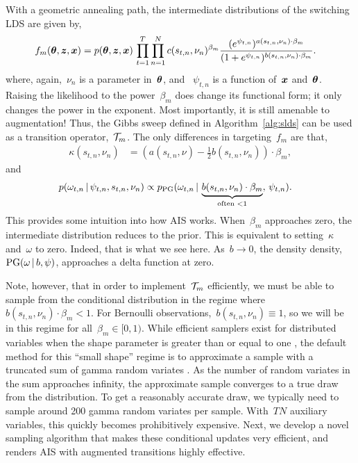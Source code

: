 With a geometric annealing path, the intermediate distributions of the 
switching LDS are given by,
\begin{align}
  \label{eq:intermediate}
  f_m(\boldsymbol{\theta}, \boldsymbol{z}, \boldsymbol{x}) 
  &= p(\boldsymbol{\theta}, \boldsymbol{z}, \boldsymbol{x}) \,  
    \prod_{t=1}^T \prod_{n=1}^N
    c(s_{t,n}, \nu_n)^{\beta_m} \frac{(e^{\psi_{t,n}})^{a(s_{t,n}, \nu_n) \cdot \beta_m}}
    {(1+e^{\psi_{t,n}})^{b(s_{t,n}, \nu_n) \cdot \beta_m}}.
\end{align}
where, again,~$\nu_n$ is a parameter in~$\boldsymbol{\theta}$, and ~$\psi_{t,n}$
is a function of~$\boldsymbol{x}$ and~$\boldsymbol{\theta}$.  Raising the likelihood to the
power~$\beta_m$ does change its functional form; it only changes the
power in the exponent.  Most importantly, it is still amenable to
\polyagamma augmentation!  Thus, the Gibbs sweep defined in
Algorithm~\ref{alg:slds} can be used as a transition
operator,~$\mathcal{T}_m$. The only differences in targeting~$f_m$ are that,
\begin{align*}
  \kappa(s_{t,n}, \nu_n) &= \left(a(s_{t,n}, \nu) - \frac{1}{2} b(s_{t,n}, \nu_n) \right) \cdot \beta_m,
\end{align*}
and
\begin{align*}
  \nonumber
  p({\omega}_{t,n} \,|\, \psi_{t,n}, s_{t,n}, \nu_n) 
  &\propto p_{\mathrm{PG}}({\omega}_{t,n} \,|\,
  \underbrace{b(s_{t,n}, \nu_n) \cdot \beta_m}_{\text{often } < 1}, \, \psi_{t,n}).
\end{align*}
This provides some intuition into how AIS works. When~$\beta_m$
approaches zero, the intermediate distribution reduces to the
prior. This is equivalent to setting~$\kappa$ and~$\omega$ to
zero. Indeed, that is what we see here. As~$b \to 0$, the density
\polyagamma density,~$\mathrm{PG}(\omega \,|\, b, \psi)$, approaches a
delta function at zero.

Note, however, that in order to implement~$\mathcal{T}_m$ efficiently, we
must be able to sample from the \polyagamma conditional distribution
in the regime where~${b(s_{t,n}, \nu_n) \cdot \beta_m < 1}$.  For
Bernoulli observations,~${b(s_{t,n}, \nu_n) \equiv 1}$, so we will be
in this regime for all~$\beta_m \in [0,1)$.  While efficient samplers
exist for \polyagamma distributed variables when the shape parameter
is greater than or equal to one \citep{windle2014sampling}, the
default method for this ``small shape'' regime is to approximate a
\polyagamma sample with a truncated sum of gamma random variates
\citep{polson2013bayesian}.  As the number of random variates in the
sum approaches infinity, the approximate sample converges to a true
draw from the \polyagamma distribution. To get a reasonably accurate
draw, we typically need to sample around 200 gamma random variates per
\polyagamma sample.  With~$TN$ auxiliary variables, this quickly
becomes prohibitively expensive. Next, we develop a novel sampling
algorithm that makes these conditional updates very efficient, and
renders AIS with \polyagamma augmented transitions highly effective.

